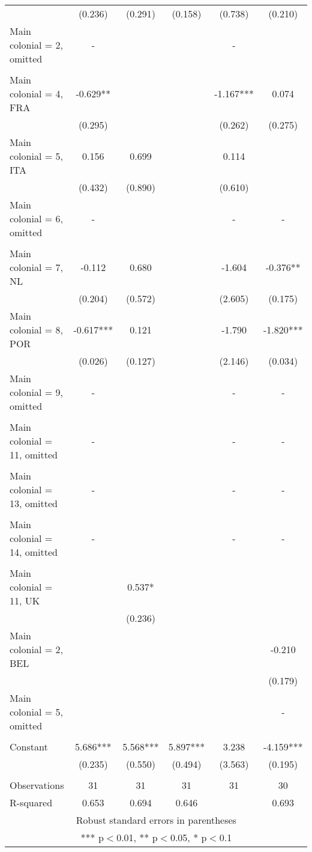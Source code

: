 \documentclass[]{article}
\begin{document}
\begin{tabular}{lccccc}
 & (0.236) & (0.291) & (0.158) & (0.738) & (0.210) \\
Main colonial = 2, omitted & - &  &  & - &  \\
 &  &  &  &  &  \\
Main colonial = 4, FRA & -0.629** &  &  & -1.167*** & 0.074 \\
 & (0.295) &  &  & (0.262) & (0.275) \\
Main colonial = 5, ITA & 0.156 & 0.699 &  & 0.114 &  \\
 & (0.432) & (0.890) &  & (0.610) &  \\
Main colonial = 6, omitted & - &  &  & - & - \\
 &  &  &  &  &  \\
Main colonial = 7, NL & -0.112 & 0.680 &  & -1.604 & -0.376** \\
 & (0.204) & (0.572) &  & (2.605) & (0.175) \\
Main colonial = 8, POR & -0.617*** & 0.121 &  & -1.790 & -1.820*** \\
 & (0.026) & (0.127) &  & (2.146) & (0.034) \\
Main colonial = 9, omitted & - &  &  & - & - \\
 &  &  &  &  &  \\
Main colonial = 11, omitted & - &  &  & - & - \\
 &  &  &  &  &  \\
Main colonial = 13, omitted & - &  &  & - & - \\
 &  &  &  &  &  \\
Main colonial = 14, omitted & - &  &  & - & - \\
 &  &  &  &  &  \\
Main colonial = 11, UK &  & 0.537* &  &  &  \\
 &  & (0.236) &  &  &  \\
Main colonial = 2, BEL &  &  &  &  & -0.210 \\
 &  &  &  &  & (0.179) \\
Main colonial = 5, omitted &  &  &  &  & - \\
 &  &  &  &  &  \\
Constant & 5.686*** & 5.568*** & 5.897*** & 3.238 & -4.159*** \\
 & (0.235) & (0.550) & (0.494) & (3.563) & (0.195) \\
 &  &  &  &  &  \\
Observations & 31 & 31 & 31 & 31 & 30 \\
 R-squared & 0.653 & 0.694 & 0.646 &  & 0.693 \\ \hline
\multicolumn{6}{c}{ Robust standard errors in parentheses} \\
\multicolumn{6}{c}{ *** p$<$0.01, ** p$<$0.05, * p$<$0.1} \\
\end{tabular}
\end{document}
